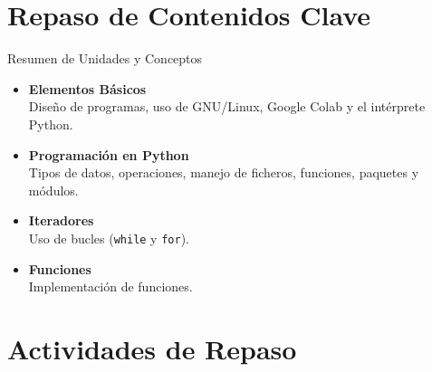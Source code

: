 \documentclass[10pt]{beamer}
\begin{document}
\section{Repaso de Contenidos Clave}

\begin{frame}{Resumen de Unidades y Conceptos}
  \begin{itemize}
    \item \textbf{Elementos Básicos} \\ 
      Diseño de programas, uso de GNU/Linux, Google Colab y el intérprete Python.
    \item \textbf{Programación en Python} \\ 
      Tipos de datos, operaciones, manejo de ficheros, funciones, paquetes y módulos.
    \item \textbf{Iteradores} \\ 
      Uso de bucles (\texttt{while} y \texttt{for}).
    \item \textbf{Funciones} \\ 
      Implementación de funciones.
  \end{itemize}
\end{frame}

\section{Actividades de Repaso}
\end{document}
